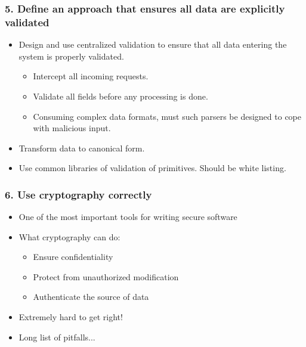 \documentclass[12pt,norsk]{beamer}
\begin{document}
\begin{frame}

	\frametitle{5. Define an approach that ensures all data are explicitly validated}
	
	\begin{itemize}
		\item Design and use centralized validation to ensure that all data entering the system is properly validated. 
		\begin{itemize}
			\item Intercept all incoming requests.
			\item Validate all fields before any processing is done.
			\item Consuming complex data formats, must such parsers be designed to cope with malicious input.

		\end{itemize}

		\item Transform data to canonical form.
		\item Use common libraries of validation of primitives. Should be white listing. 			
	
	\end{itemize}
	

\end{frame}

\begin{frame}

	\frametitle{6. Use cryptography correctly}

	\begin{itemize}
		
		\item One of the most important tools for writing secure software
		\item What cryptography can do:
	
		\begin{itemize}
	
			\item Ensure confidentiality	
			\item Protect from unauthorized modification
			\item Authenticate the source of data
		\end{itemize}	 
	
		\item Extremely hard to get right!
		\item Long list of pitfalls...	
	
	\end{itemize}

\end{frame}
\end{document}
